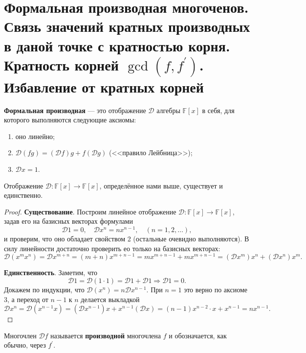 \section{Формальная производная многоченов. Связь значений кратных производных в даной точке с кратностью корня. Кратность корней $\gcd(f, f^\prime)$. Избавление от кратных корней}

\begin{definition}
    \textbf{Формальная производная} --- это отображение $\mathcal{D}$ алгебры $\mathbb{F}[x]$ в себя, для которого выполняются следующие аксиомы:
    \begin{enumerate}[nolistsep]
        \item оно линейно;
        \item $\mathcal{D}(fg) = (\mathcal{D}f)g + f(\mathcal{D}g)$ (<<правило Лейбница>>);
        \item $\mathcal{D}x = 1$.
    \end{enumerate}
\end{definition}

\begin{theorem}
    Отображение $\mathcal{D}: \mathbb{F}[x] \rightarrow \mathbb{F}[x]$, определённое нами выше, существует и единственно.
\end{theorem}

\begin{proof}
    \textbf{Существование}. Построим линейное отображение $\mathcal{D}: \mathbb{F}[x] \rightarrow \mathbb{F}[x]$, задав его на базисных векторах формулами
    $$
    \mathcal{D}1 = 0,\quad \mathcal{D}x^n = nx^{n - 1},\quad (n = 1, 2, \ldots),
    $$
    и проверим, что оно обладает свойством 2 (остальные очевидно выполняются). В силу линейности достаточно проверить ео только на базисных векторах:
    $$
    \mathcal{D}(x^mx^n) = \mathcal{D}x^{m + n} = (m + n)x^{m + n - 1} = mx^{m + n - 1} + mx^{m + n - 1} = (\mathcal{D}x^m)x^n + (\mathcal{D}x^n)x^m.
    $$

    \textbf{Единственность}. Заметим, что
    $$
    \mathcal{D}1 = \mathcal{D}(1 \cdot 1) = \mathcal{D}1 + \mathcal{D}1 \Rightarrow \mathcal{D}1 = 0.
    $$
    Докажем по индукции, что $\mathcal{D}(x^n) = n\mathcal{D}x^{n - 1}$. При $n = 1$ это верно по аксиоме 3, а переход от $n - 1$ к $n$ делается выкладкой
    $$
    \mathcal{D}x^n = \mathcal{D}(x^{n - 1}x) = (\mathcal{D}x^{n - 1})x + x^{n - 1}(\mathcal{D}x) = (n - 1)x^{n - 2}\cdot x + x^{n - 1} = nx^{n - 1}.
    $$
\end{proof}

\begin{definition}
    Многочлен $\mathcal{D}f$ называется \textbf{производной} многочлена $f$ и обозначается, как обычно, через $f^\prime$.
\end{definition}

